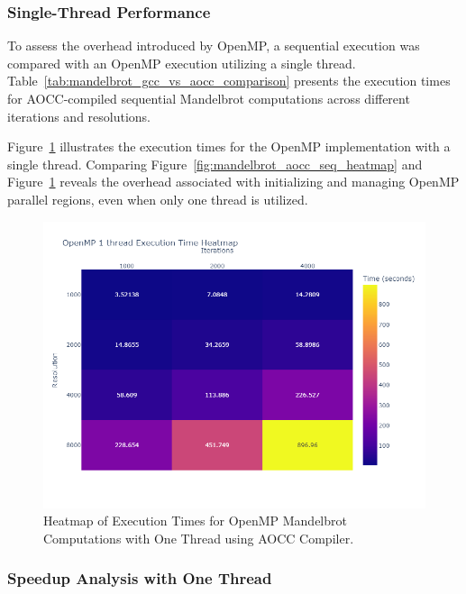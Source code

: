 \documentclass[
	report, %
	11pt, %
]{CSUniSchoolLabReport}
\newcounter{ct}
\begin{document}
\subsubsection{Single-Thread Performance}

To assess the overhead introduced by OpenMP, a sequential execution was compared with an OpenMP execution utilizing a single thread. Table~\ref{tab:mandelbrot_gcc_vs_aocc_comparison} presents the execution times for AOCC-compiled sequential Mandelbrot computations across different iterations and resolutions.

Figure~\ref{fig:mandelbrot_openMP_1_thread_heatmap} illustrates the execution times for the OpenMP implementation with a single thread. Comparing Figure~\ref{fig:mandelbrot_aocc_seq_heatmap} and Figure~\ref{fig:mandelbrot_openMP_1_thread_heatmap} reveals the overhead associated with initializing and managing OpenMP parallel regions, even when only one thread is utilized.

\begin{figure}[H]
	\captionsetup{justification=centering, width=.8\linewidth}
	\centering
	\includegraphics[width=\textwidth]{./img/mandelbrot_openmp_1_thread_heatmap.png}
	\caption{Heatmap of Execution Times for OpenMP Mandelbrot Computations with One Thread using AOCC Compiler.}
	\label{fig:mandelbrot_openMP_1_thread_heatmap}
\end{figure}

\subsubsection{Speedup Analysis with One Thread}
\end{document}
